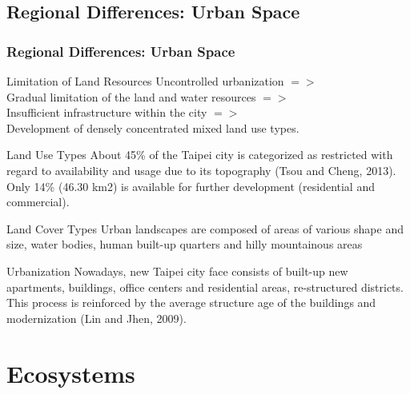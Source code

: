 \documentclass[pdflatex,compress,8pt,
	xcolor={dvipsnames,dvipsnames,svgnames,x11names,table},
	hyperref={	
	breaklinks = true, 
	pdfauthor={Lemenkova Polina}, 
	pdfsubject={Preentation}, 
	pdfcreator={Lemenkova Polina}, 
	pdfproducer={Lemenkova Polina}, 
	colorlinks=true,
	linkcolor=Gold1, 
	citecolor=NavyBlue, 
	urlcolor = NavyBlue, 
	breaklinks = true}]{beamer}
\begin{document}
\subsection{Regional Differences: Urban Space}
\begin{frame}\frametitle{Regional Differences: Urban Space}

\begin{alertblock}{Limitation of Land Resources}
Uncontrolled urbanization $=>$ \\
Gradual limitation of the land and water resources $=>$ \\
Insufficient infrastructure within the city $=>$ \\
Development of densely concentrated mixed land use types.
\end{alertblock}

\begin{block}{Land Use Types}
About 45\% of the Taipei city is categorized as restricted with regard to availability and usage due to its topography (Tsou and Cheng, 2013). \\
Only 14\% (46.30 km2) is available for further development (residential and commercial).
\end{block}

\begin{block}{Land Cover Types}
Urban landscapes are composed of areas of various shape and size, water bodies, human built-up quarters and hilly mountainous areas
\end{block}

\begin{examples}{Urbanization}
Nowadays, new Taipei city face consists of built-up new apartments, buildings, office centers and residential areas, re-structured districts. \\
This process is reinforced by the average structure age of the buildings and modernization (Lin and Jhen, 2009).
\end{examples}

\end{frame}

\section{Ecosystems}
\end{document}
